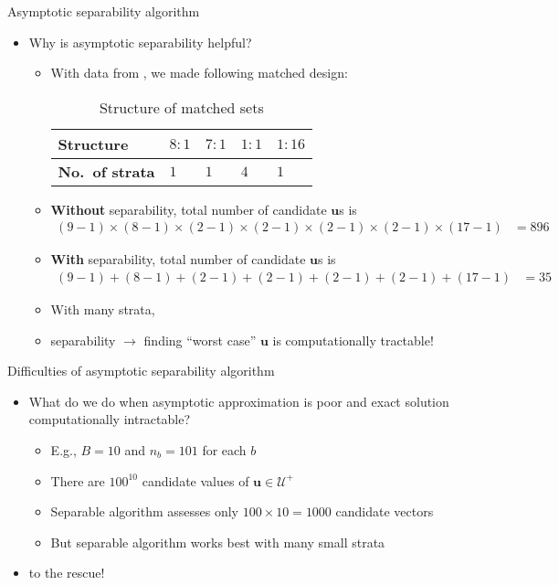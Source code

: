 \documentclass[table, xcolor={dvipsnames}, 9pt]{beamer}
\theoremstyle{newstyle}
\begin{document}
\begin{frame}{Asymptotic separability algorithm}
\vfill
\begin{itemize} \vfill
\item Why is asymptotic separability helpful? \vfill
\begin{itemize} \vfill
\item With data from \citet{cerdaetal2012}, we made following matched design: \vfill
\vspace{2em}
\begin{table}[H]
\begin{tabular}{l|l|l|l|l}
\textbf{Structure} & $8:1$ & $7:1$ & $1:1$ & $1:16$ \\ \hline 
\textbf{No.~of strata} & $1$   & $1$   & $4$   & $1$ \\
\end{tabular}
\caption{Structure of matched sets}
\end{table} \vfill
\item \textbf{Without} separability, total number of candidate $\bm{u}$s is \vfill
\begin{align*}
(9 - 1) \times (8 - 1) \times (2 - 1) \times (2 - 1) \times (2 - 1) \times (2 - 1) \times (17 - 1) & = 896
\end{align*} \vfill
\item \textbf{With} separability, total number of candidate $\bm{u}$s is \vfill
\begin{align*}
(9 - 1) + (8 - 1) + (2 - 1) + (2 - 1) + (2 - 1) + (2 - 1) + (17 - 1) & = 35
\end{align*} \vfill
\item With many strata, \vfill
\item[] separability $\rightarrow$ finding ``worst case'' $\bm{u}$ is computationally tractable! \vfill
\end{itemize} \vfill
\end{itemize} \vfill
\end{frame}
\begin{frame}{Difficulties of asymptotic separability algorithm}
\vfill
\begin{itemize} \vfill
\item What do we do when asymptotic approximation is poor and exact solution computationally intractable? \vfill
\begin{itemize} \vfill
\item E.g., $B = 10$ and $n_b = 101$ for each $b$ \vfill
\item[] There are $100^{10}$ candidate values of $\bm{u} \in \mathcal{U}^+$ \vfill
\item[] Separable algorithm assesses only $100 \times 10 = 1000$ candidate vectors \vfill
\item[] But separable algorithm works best with many small strata \vfill
\end{itemize} \vfill
\item \citet{rosenbaum2018} to the rescue!
\end{itemize} \vfill
\end{frame}
\end{document}

